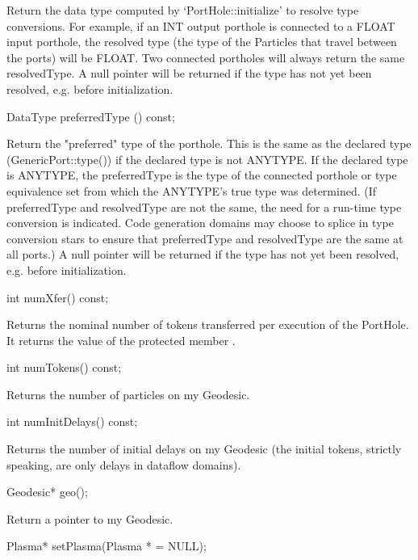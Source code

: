 Return the data type computed by `PortHole::initialize' to resolve type
conversions.  For example, if an INT output porthole is connected to a FLOAT
input porthole, the resolved type (the type of the Particles that travel
between the ports) will be FLOAT.  Two connected portholes will always return
the same resolvedType.  A null pointer will be returned if the type has not
yet been resolved, e.g. before initialization.

\begin{example}
DataType preferredType () const;
\end{example}

Return the "preferred" type of the porthole.  This is the same as the
declared type (GenericPort::type()) if the declared type is not ANYTYPE.
If the declared type is ANYTYPE, the preferredType is the type of the
connected porthole or type equivalence set from which the ANYTYPE's true type
was determined.  (If preferredType and resolvedType are not the same, the
need for a run-time type conversion is indicated.  Code generation domains
may choose to splice in type conversion stars to ensure that preferredType
and resolvedType are the same at all ports.)  A null pointer will be returned
if the type has not yet been resolved, e.g. before initialization.

\begin{example}
int numXfer() const;
\end{example}

Returns the nominal number of tokens transferred per execution of the
PortHole.  It returns the value of the protected member .

\begin{example}
int numTokens() const;
\end{example}

Returns the number of particles on my Geodesic.

\begin{example}
int numInitDelays() const;
\end{example}

Returns the number of initial delays on my Geodesic (the initial tokens,
strictly speaking, are only delays in dataflow domains).

\begin{example}
Geodesic* geo();
\end{example}

Return a pointer to my Geodesic.

\begin{example}
Plasma* setPlasma(Plasma * = NULL);
\end{example}


